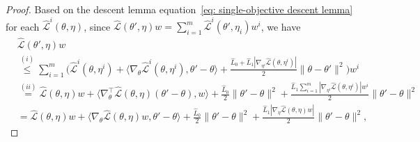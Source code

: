 \documentclass[10pt,a4paper]{amsart}
\def\eqref#1{equation~\ref{#1}}
\newcommand{\fL}{\mathcal{L}}
\newcommand{\fhL}{\hat{\mathcal{L}}}
\newcommand{\hL}{\hat{L}}
\begin{document}
\begin{proof}
Based on the descent lemma \eqref{eq: single-objective descent lemma} for each $\fhL^i(\theta, \eta)$, since $\fhL({\theta}', {\eta}){w} = \sum_{i=1}^{m} \fhL^i({\theta}',{\eta}_i)w^i$, we have
\begin{align}
    &\fhL({\theta}', {\eta}){w} \nonumber\\
    &\overset{(i)}{\leq} \sum_{i=1}^{m}\Big( {\fhL}^i({\theta}, \eta^i)+\langle\nabla_{{\theta}} {\fhL}^i({\theta}, \eta^i), {\theta}'-{\theta}\rangle+\frac{\hL_0+\hL_1|\nabla_{\eta^i} {\fhL}({\theta}, \eta^i)|}{2}\|{\theta}-{\theta}'\|^2\Big)w^i \nonumber\\
    & \overset{(ii)}{=} \fhL({\theta}, {\eta}){w}+ \langle  \nabla_{\theta}^{\top}\fhL(\theta,\eta)(\theta'-\theta), w \rangle + \frac{\hL_0}{2}\|{\theta}'-{\theta} \|^2+ \frac{\hL_1\sum_{i=1}^{m} | \nabla_{\eta^i} \fhL({\theta}, {\eta}^i)| w^i}{2}\|{\theta}'-{\theta} \|^2 \nonumber\\
    &= \fhL({\theta}, {\eta}){w} + \langle \nabla_{\theta}\fhL({\theta}, {\eta})w,{\theta}'-{\theta} \rangle + \frac{\hL_0}{2}\|{\theta}'-{\theta} \|^2+ \frac{\hL_1 | \nabla_{\eta} \fhL({\theta}, {\eta})w| }{2}\|{\theta}'-{\theta} \|^2,  \nonumber

\end{align}
\end{proof}
\end{document}
